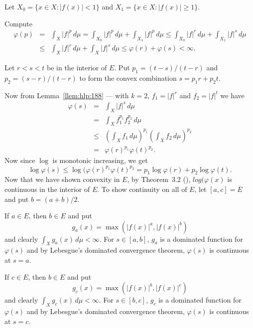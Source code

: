 \begin{enumerate}
 Let \(X_0 = \{x\in X: |f(x)|<1\}\)
 and \(X_1 = \{x\in X: |f(x)|\geq 1\}\).

\begin{itemize}
 Compute
 \begin{eqnarray*}
 \varphi(p)
 &=& \int_X |f|^p\,d\mu
 = \int_{X_0} |f|^p\,d\mu + \int_{X_1} |f|^p\,d\mu
 \leq \int_{X_0} |f|^r\,d\mu + \int_{X_1} |f|^s\,d\mu \\
 &\leq& \int_{X} |f|^r\,d\mu + \int_{X} |f|^s\,d\mu
 \leq \varphi(r) + \varphi(s) < \infty.
 \end{eqnarray*}


  Let \(r < s < t\) be in the interior of $E$.
  Put \(p_1 = (t-s)/(t-r)\)
  and \(p_2 = (s-r)/(t-r)\)
  to form  the convex combination \(s = p_1 r + p_2 t\).

  Now from Lemma~\ref{llem:hlp:188} --- with \(k=2\),
  \(f_1 = |f|^r\) and
  \(f_2 = |f|^t\) we have
  \begin{eqnarray*}
    \varphi(s)
    &=&    \int_X |f|^s\,d\mu \\
    &=&    \int_X f_1^{p_1} f_2^{p_2}\,d\mu \\
    &\leq& \left( \int_X f_1\,d\mu \right)^{p_1}
           \left( \int_X f_2\,d\mu \right)^{p_2} \\
    &=&    \varphi(r)^{p_1} \varphi(t)^{p_2}.
  \end{eqnarray*}
  Now since \(\log\) is monotonic increasing, we get
  \begin{equation*}
  \log\varphi(s) \leq  \log(\varphi(r)^{p_1} \varphi(t)^{p_2} =
           p_1\log\varphi(r) + p_2\log\varphi(t).
  \end{equation*}
  Now that we have shown convexity in $E$,
  by Theorem~3.2 (\cite{RudinRCA80}), \(log(\varphi(x)\) is continuous in
  the interior of $E$. To show continuity on all of $E$,
  let \([a,c] = \overline{E}\) and put \(b=(a+b)/2\).

  If \(a\in E\), then \(b\in E\) and put
  \begin{equation*}
  g_a(x) = \max(|f(x)|^a, |f(x)|^b)
  \end{equation*}
  and clearly \(\int_X g_a(x)\,d\mu < \infty\).
  For \(s\in[a,b]\),  \(g_a\) is a dominated function for \(\varphi(s)\)
  and by Lebesgue's dominated convergence theorem, \(\varphi(s)\)
  is continuous at \(s=a\).

  If \(c\in E\), then \(b\in E\) and put
  \begin{equation*}
  g_c(x) = \max\left(|f(x)|^b, |f(x)|^c\right)
  \end{equation*}
  and clearly \(\int_X g_c(x)\,d\mu < \infty\).
  For \(s\in[b,c]\),  \(g_c\) is a dominated function for \(\varphi(s)\)
  and by Lebesgue's dominated convergence theorem, \(\varphi(s)\)
  is continuous at \(s=c\).


\end{itemize}
\end{enumerate}
